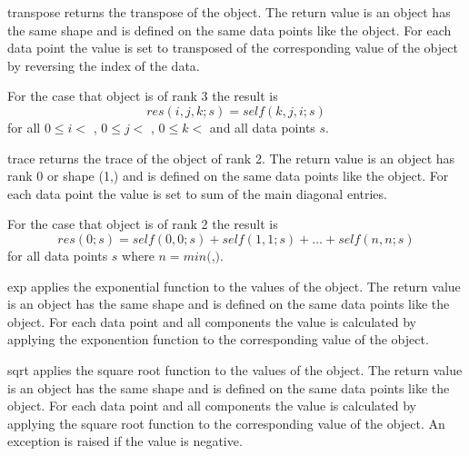 \begin{methoddesc}[Data]{transpose}{}
returns the transpose of the object. The return value is an object has
the same shape and is defined on the same data points like the object.
For each data point the value is set to transposed of the
corresponding value of the object by reversing the index of the data.

For the case that object  is of rank 3 the result  is
\begin{equation}
res(i,j,k;s)=self(k,j,i;s)
\end{equation}
for all 
$0\le i <$ ,
$0\le j <$ ,
$0\le k <$ 
and all data points $s$.
\end{methoddesc}

\begin{methoddesc}[Data]{trace}{}
returns the trace of the object of rank 2. The return value is an
object has rank 0 or shape (1,) and is defined on the same data points
like the object. For each data point the value is set to sum of the
main diagonal entries.

For the case that object  is of rank 2 the result 
is
\begin{equation}
res(0;s)=
self(0,0;s)+
self(1,1;s)+
\ldots +
self(n,n;s)
\end{equation}
for all data points $s$ where
$n=min($,$)$.
\end{methoddesc}

\begin{methoddesc}[Data]{exp}{}
applies the exponential function to the values of the object. The
return value is an object has the same shape and is defined on the
same data points like the object.  For each data point and all
components the value is calculated by applying the exponention
function to the corresponding value of the object.  
\end{methoddesc}

\begin{methoddesc}[Data]{sqrt}{}
applies the square root function to the values of the object. The
return value is an object has the same shape and is defined on the
same data points like the object.  For each data point and all
components the value is calculated by applying the square root
function to the corresponding value of the object. An exception is
raised if the value is negative.  
\end{methoddesc}

